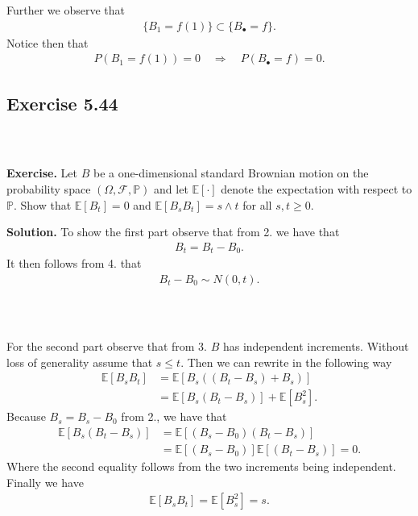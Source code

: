 \documentclass{beamer}
\numberwithin{equation}{section}
\newenvironment{frame2}{\begin{frame}\frametitle{{\normalsize \secname} \\ {\large \subsecname}}}{\end{frame}}
\begin{document}
\begin{frame2}
    Further we observe that
    \begin{align}
        \{B_1 = f(1)\} \subset \{B_\bullet = f\}.
    \end{align}
    Notice then that
    \begin{align}
        P(B_1 = f(1)) = 0 \quad \Rightarrow \quad P(B_\bullet = f) = 0.
    \end{align}
\end{frame2}

\subsection{Exercise 5.44}

\begin{frame2}
    \textbf{Exercise.} 
    Let $B$ be a one-dimensional standard Brownian motion on the probability space $(\Omega, \mathcal{F}, \mathbb{P})$ and let $\mathbb{E}[\cdot]$ denote the expectation with respect to $\mathbb{P}$.
    Show that $\mathbb{E}[B_t] = 0$ and $\mathbb{E}[B_s B_t] = s \wedge t$ for all $s,t \geq 0$.

    \vspace{10pt}
    \textbf{Solution.}
    To show the first part observe that from 2.\! we have that
    \begin{align}
        B_t = B_t - B_0.
    \end{align}
    It then follows from 4.\! that
    \begin{align}
        B_t - B_0 \sim N(0,t).
    \end{align}
\end{frame2}

\begin{frame2}
    For the second part observe that from 3.\! $B$ has independent increments.
    Without loss of generality assume that $s \leq t$.
    Then we can rewrite in the following way
    \begin{align}
        \mathbb{E}[B_sB_t] &= \mathbb{E}[B_s((B_t - B_s) + B_s)] \\
        &= \mathbb{E}[B_s(B_t - B_s)] + \mathbb{E}[B_s^2].
    \end{align}
    Because $B_s = B_s - B_0$ from 2., we have that
    \begin{align}
        \mathbb{E}[B_s(B_t - B_s)] &= \mathbb{E}[(B_s - B_0)(B_t - B_s)] \\
        &= \mathbb{E}[(B_s - B_0)]\mathbb{E}[(B_t - B_s)] = 0.
    \end{align} 
    Where the second equality follows from the two increments being independent.
    Finally we have
    \begin{align}
        \mathbb{E}[B_sB_t] = \mathbb{E}[B_s^2] = s.
    \end{align}
\end{frame2}
\end{document}
